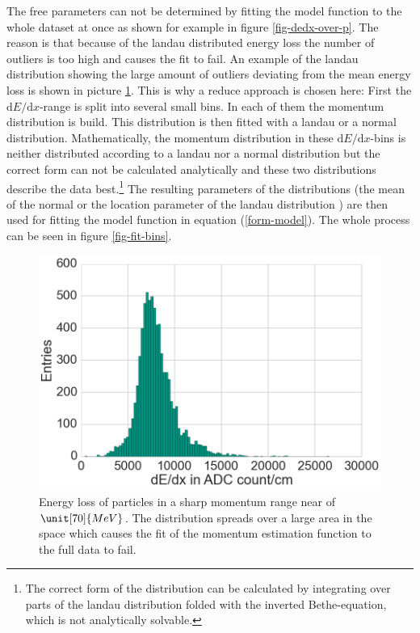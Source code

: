 The free parameters can not be determined by fitting the model function to the whole dataset at once as shown for example in figure \ref{fig-dedx-over-p}. The reason is that because of the landau distributed energy loss the number of outliers is too high and causes the fit to fail. An example of the landau distribution showing the large amount of outliers deviating from the mean energy loss is shown in picture \ref{fig-landau}. This is why a reduce approach is chosen here: First the $\mathrm d E / \mathrm d x$-range is split into several small bins. In each of them the momentum distribution is build. This distribution is then fitted with a landau or a normal distribution. Mathematically, the momentum distribution in these $\mathrm d E / \mathrm d x$-bins is neither distributed according to a landau nor a normal distribution but the correct form can not be calculated analytically and these two distributions describe the data best.\footnote{The correct form of the distribution can be calculated by integrating over parts of the landau distribution folded with the inverted Bethe-equation, which is not analytically solvable.} The resulting parameters of the distributions (the mean of the normal or the location parameter of the landau distribution \cite{landau}) are then used for fitting the model function in equation (\ref{form-model}). The whole process can be seen in figure \ref{fig-fit-bins}.

\begin{figure}
  \centering
  \includegraphics[width=0.7\linewidth]{figures/vxd/landau.png}
  \caption[Energy loss of particles in a sharp momentum range near of 70 MeV.]{Energy loss of particles in a sharp momentum range near of $\unit[70]{MeV}$. The distribution spreads over a large area in the \dedx space which causes the fit of the momentum estimation function to the full data to fail.}
  \label{fig-landau}
\end{figure}

